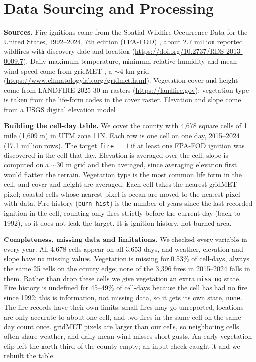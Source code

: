 \documentclass[11pt]{article}
\begin{document}
\section{Data Sourcing and Processing}

\textbf{Sources.} Fire ignitions come from the Spatial Wildfire Occurrence Data for the United
States, 1992--2024, 7th edition (FPA-FOD) \cite{fpafod}, about 2.7 million reported wildfires with
discovery date and location (\url{https://doi.org/10.2737/RDS-2013-0009.7}). Daily maximum
temperature, minimum relative humidity and mean wind speed come from gridMET \cite{gridmet}, a
$\sim$4 km grid (\url{https://www.climatologylab.org/gridmet.html}). Vegetation cover and height
come from LANDFIRE 2025 \cite{landfire} 30 m rasters (\url{https://landfire.gov}); vegetation type is
taken from the life-form codes in the cover raster. Elevation and slope come from a USGS digital
elevation model \cite{dem}

\textbf{Building the cell-day table.} We cover the county with 4,678 square cells of 1 mile
(1,609 m) in UTM zone 11N. Each row is one cell on one day, 2015--2024 (17.1 million rows). The
target \texttt{fire} $=1$ if at least one FPA-FOD ignition was discovered in the cell that day.
Elevation is averaged over the cell; slope is computed on a $\sim$30 m grid and then averaged, since
averaging elevation first would flatten the terrain. Vegetation type is the most common life form
in the cell, and cover and height are averaged. Each cell takes the nearest gridMET pixel; coastal
cells whose nearest pixel is ocean are moved to the nearest pixel with data. Fire history
(\texttt{burn\_hist}) is the number of years since the last recorded ignition in the cell, counting
only fires strictly before the current day (back to 1992), so it does not leak the target. It is
ignition history, not burned area.

\textbf{Completeness, missing data and limitations.} We checked every variable in every year. All
4,678 cells appear on all 3,653 days, and weather, elevation and slope have no missing values.
Vegetation is missing for 0.53\% of cell-days, always the same 25 cells on the county edge; none of
the 3,396 fires in 2015--2024 falls in them. Rather than drop these cells we give vegetation an
extra \texttt{missing} state. Fire history is undefined for 45--49\% of cell-days because the cell has
had no fire since 1992; this is information, not missing data, so it gets its own state,
\texttt{none}. The fire records have their own limits: small fires may go unreported, locations are
only accurate to about one cell, and two fires in the same cell on the same day count once. gridMET
pixels are larger than our cells, so neighboring cells often share weather, and daily mean wind
misses short gusts. An early vegetation clip left the north third of the county empty; an input
check caught it and we rebuilt the table.
\end{document}
